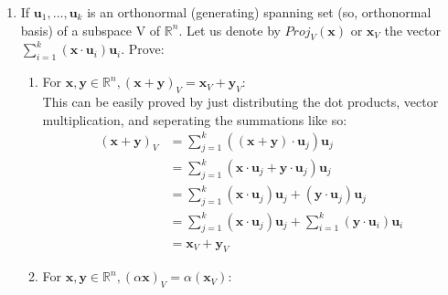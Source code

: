 \documentclass[12pt]{article}
\begin{document}
\begin{enumerate}
          \begin{enumerate}
              \item{}
                    The parameterization of a line is in the same form of an affine subset in $\mathbb{R}^n$.
                    The base point $\mathbf{x}_0$ is the same as the point $\mathbf{p}$. While $V = t\mathbf{a} = span(\mathbf{a})$.
                    $\mathbf{a}$ represents the subspace V because any two vectors lying on the line added together will still lie on the line and if $\mathbf{a}$ is scaled by any real number it also still lies on the line.
                    dim(V) = dim(F) = dim($\mathbf{x}_0+t\mathbf{a}$) = 1
              \item{} Expanding H you get the hyperplane in the form $a\mathbf{x}+b\mathbf{y}+\dots+c\mathbf{z} + d$, if d=0 then the plane goes through the origin and is not a affine subset, otherwise it is.


          \end{enumerate}
    \item{}
          If $\mathbf{u}_1, \ldots, \mathbf{u}_k$ is an orthonormal (generating) spanning set (so, orthonormal basis) of a subspace V of $\mathbb{R}^n$.
          Let us denote by $Proj_V (\mathbf{x})$ or $\mathbf{x}_V $ the vector  $\sum_{i=1}^{k} (\mathbf{x} \cdot \mathbf{u}_i)\mathbf{u}_i$.
          Prove:

          \begin{enumerate}
              \item{} For \( \mathbf{x}, \mathbf{y} \in \mathbb{R}^n, (\mathbf{x} + \mathbf{y})_{V} = \mathbf{x}_{V} + \mathbf{y}_{V} \): \\

                    This can be easily proved by just distributing the dot products, vector multiplication, and seperating the summations like so:
                    \begin{align*}
                        (\mathbf{x}+\mathbf{y})_V & = \sum_{j=1}^k ((\mathbf{x}+\mathbf{y})\cdot{\mathbf{u}_j})\mathbf{u}_j                                             \\
                                                  & = \sum_{j=1}^k (\mathbf{x}\cdot{\mathbf{u}_j}+\mathbf{y}\cdot{\mathbf{u}_j})\mathbf{u}_j                            \\
                                                  & = \sum_{j=1}^k (\mathbf{x}\cdot{\mathbf{u}_j})\mathbf{u}_j+ (\mathbf{y}\cdot{\mathbf{u}_j})\mathbf{u}_j             \\
                                                  & = \sum_{j=1}^k (\mathbf{x}\cdot{\mathbf{u}_j})\mathbf{u}_j+\sum_{i=1}^k (\mathbf{y}\cdot{\mathbf{u}_i})\mathbf{u}_i \\
                                                  & = \mathbf{x}_V+\mathbf{y}_V
                    \end{align*}
              \item{} For \(\mathbf{x},\mathbf{y}\in{\mathbb{R}^n}, (\alpha\mathbf{x})_V = \alpha(\mathbf{x}_V) \): \\


\end{enumerate}
\end{enumerate}
\end{document}
